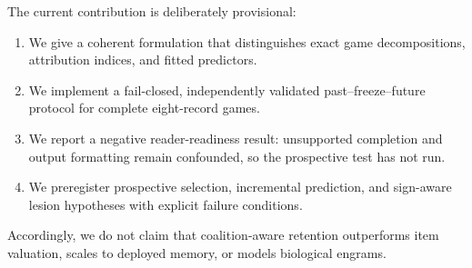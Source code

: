 The current contribution is deliberately provisional:
\begin{enumerate}
    \item We give a coherent formulation that distinguishes exact game
    decompositions, attribution indices, and fitted predictors.
    \item We implement a fail-closed, independently validated
    past--freeze--future protocol for complete eight-record games.
    \item We report a negative reader-readiness result: unsupported completion and
    output formatting remain confounded, so the prospective test has not run.
    \item We preregister prospective selection, incremental prediction, and
    sign-aware lesion hypotheses with explicit failure conditions.
\end{enumerate}

Accordingly, we do not claim that coalition-aware retention outperforms item
valuation, scales to deployed memory, or models biological engrams.
